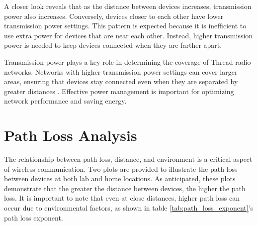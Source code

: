 A closer look reveals that as the distance between devices increases, transmission power also increases. Conversely, devices closer to each other have lower transmission power settings. This pattern is expected because it is inefficient to use extra power for devices that are near each other. Instead, higher transmission power is needed to keep devices connected when they are farther apart.

Transmission power plays a key role in determining the coverage of Thread radio networks. Networks with higher transmission power settings can cover larger areas, ensuring that devices stay connected even when they are separated by greater distances \cite{sheth2002implementation}. Effective power management is important for optimizing network performance and saving energy.


\section{Path Loss Analysis}

The relationship between path loss, distance, and environment is a critical aspect of wireless communication. Two plots are provided to illustrate the path loss between devices at both lab and home locations. As anticipated, these plots demonstrate that the greater the distance between devices, the higher the path loss. It is important to note that even at close distances, higher path loss can occur due to environmental factors, as shown in table \ref{tab:path_loss_exponent}'s path loss exponent.

